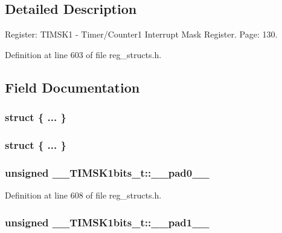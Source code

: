 \subsection{Detailed Description}
Register\+: T\+I\+M\+S\+K1 -\/ Timer/\+Counter1 Interrupt Mask Register. Page\+: 130. 

Definition at line 603 of file reg\+\_\+structs.\+h.



\subsection{Field Documentation}
\hypertarget{union_____t_i_m_s_k1bits__t_a2055764ffd53648712eb3c114e92d4fe}{\subsubsection[{"@145}]{\setlength{\rightskip}{0pt plus 5cm}struct \{ ... \} }}\label{union_____t_i_m_s_k1bits__t_a2055764ffd53648712eb3c114e92d4fe}
\hypertarget{union_____t_i_m_s_k1bits__t_ac4020b4a8df7b94b40fd285aaf065996}{\subsubsection[{"@147}]{\setlength{\rightskip}{0pt plus 5cm}struct \{ ... \} }}\label{union_____t_i_m_s_k1bits__t_ac4020b4a8df7b94b40fd285aaf065996}
\hypertarget{union_____t_i_m_s_k1bits__t_a4a8430370a3d278b9b8b1df8cb5c675e}{
\subsubsection[{\+\_\+\+\_\+pad0\+\_\+\+\_\+}]{\setlength{\rightskip}{0pt plus 5cm}unsigned \+\_\+\+\_\+\+T\+I\+M\+S\+K1bits\+\_\+t\+::\+\_\+\+\_\+pad0\+\_\+\+\_\+}}\label{union_____t_i_m_s_k1bits__t_a4a8430370a3d278b9b8b1df8cb5c675e}


Definition at line 608 of file reg\+\_\+structs.\+h.

\hypertarget{union_____t_i_m_s_k1bits__t_a52cec2ba6804b4075e7869303c599aee}{
\subsubsection[{\+\_\+\+\_\+pad1\+\_\+\+\_\+}]{\setlength{\rightskip}{0pt plus 5cm}unsigned \+\_\+\+\_\+\+T\+I\+M\+S\+K1bits\+\_\+t\+::\+\_\+\+\_\+pad1\+\_\+\+\_\+}}\label{union_____t_i_m_s_k1bits__t_a52cec2ba6804b4075e7869303c599aee}


